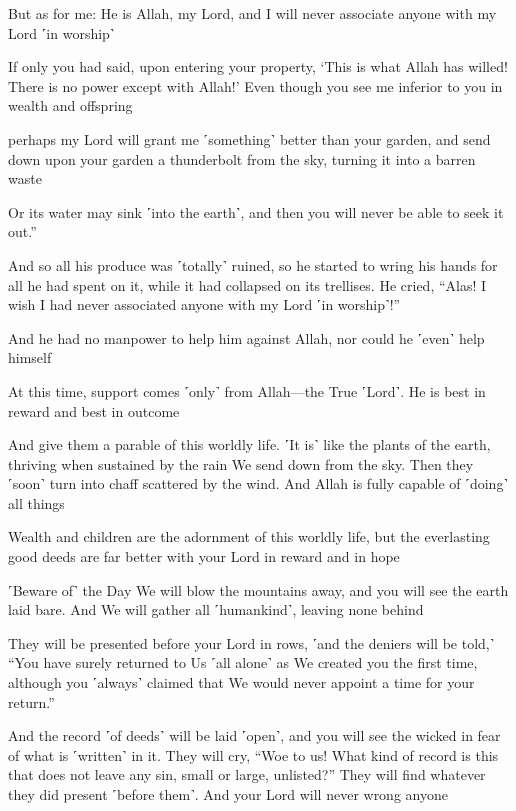 But as for me: He is Allah, my Lord, and I will never associate anyone with my Lord ˹in worship˺

If only you had said, upon entering your property, ‘This is what Allah has willed! There is no power except with Allah!’ Even though you see me inferior to you in wealth and offspring

perhaps my Lord will grant me ˹something˺ better than your garden, and send down upon your garden a thunderbolt from the sky, turning it into a barren waste

Or its water may sink ˹into the earth˺, and then you will never be able to seek it out.”

And so all his produce was ˹totally˺ ruined, so he started to wring his hands for all he had spent on it, while it had collapsed on its trellises. He cried, “Alas! I wish I had never associated anyone with my Lord ˹in worship˺!”

And he had no manpower to help him against Allah, nor could he ˹even˺ help himself

At this time, support comes ˹only˺ from Allah—the True ˹Lord˺. He is best in reward and best in outcome

And give them a parable of this worldly life. ˹It is˺ like the plants of the earth, thriving when sustained by the rain We send down from the sky. Then they ˹soon˺ turn into chaff scattered by the wind. And Allah is fully capable of ˹doing˺ all things

Wealth and children are the adornment of this worldly life, but the everlasting good deeds are far better with your Lord in reward and in hope

˹Beware of˺ the Day We will blow the mountains away, and you will see the earth laid bare. And We will gather all ˹humankind˺, leaving none behind

They will be presented before your Lord in rows, ˹and the deniers will be told,˺ “You have surely returned to Us ˹all alone˺ as We created you the first time, although you ˹always˺ claimed that We would never appoint a time for your return.”

And the record ˹of deeds˺ will be laid ˹open˺, and you will see the wicked in fear of what is ˹written˺ in it. They will cry, “Woe to us! What kind of record is this that does not leave any sin, small or large, unlisted?” They will find whatever they did present ˹before them˺. And your Lord will never wrong anyone

